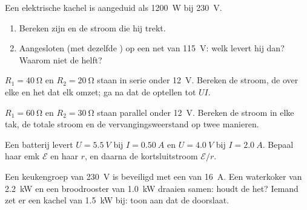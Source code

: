 \begin{exercise}[$\star\star$]\label{exo:g11:circuits-and-power:6}
Een elektrische kachel is aangeduid als \qty{1200}{W} bij \qty{230}{V}.
\begin{enumerate}
  \item Bereken zijn  en de stroom die hij trekt.
  \item Aangesloten (met dezelfde ) op een net van \qty{115}{V}:
        welk  levert hij dan? Waarom niet de helft?
\end{enumerate}
\end{exercise}

\begin{exercise}[$\star\star$]\label{exo:g11:circuits-and-power:7}
$R_1 = \qty{40}{\ohm}$ en $R_2 = \qty{20}{\ohm}$ staan in serie onder
\qty{12}{V}. Bereken de stroom, de  over elke  en het
 dat elk omzet; ga na dat de  optellen tot $UI$.
\end{exercise}

\begin{exercise}[$\star\star$]\label{exo:g11:circuits-and-power:8}
$R_1 = \qty{60}{\ohm}$ en $R_2 = \qty{30}{\ohm}$ staan parallel onder
\qty{12}{V}. Bereken de stroom in elke tak, de totale stroom en de
vervangingsweerstand op twee manieren.
\end{exercise}

\begin{exercise}[$\star\star$]\label{exo:g11:circuits-and-power:9}
Een batterij levert $U = \qty{5.5}{V}$ bij $I = \qty{0.50}{A}$ en
$U = \qty{4.0}{V}$ bij $I = \qty{2.0}{A}$. Bepaal haar emk
$\mathcal{E}$ en haar  $r$, en daarna de
kortsluitstroom $\mathcal{E}/r$.
\end{exercise}

\begin{exercise}[$\star\star$]\label{exo:g11:circuits-and-power:10}
Een keukengroep van \qty{230}{V} is beveiligd met een  van
\qty{16}{A}. Een waterkoker van \qty{2.2}{kW} en een broodrooster van
\qty{1.0}{kW} draaien samen: houdt de  het? Iemand zet er een
kachel van \qty{1.5}{kW} bij: toon aan dat de  doorslaat.
\end{exercise}

